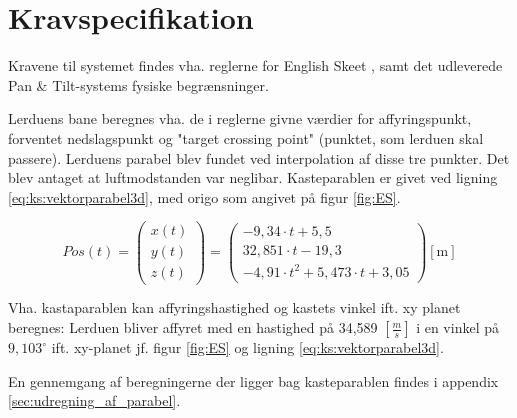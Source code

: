 \section{Kravspecifikation}
\label{sec:kravspecifikation}
Kravene til systemet findes vha. reglerne for English Skeet \citep{ES_regler},
samt det udleverede Pan \& Tilt-systems fysiske begrænsninger.


Lerduens bane beregnes vha. de i reglerne givne værdier for affyringspunkt, forventet nedslagspunkt
og "target crossing point" (punktet, som lerduen skal passere).
Lerduens parabel blev fundet ved interpolation af disse tre punkter. Det blev antaget at luftmodstanden var neglibar.
Kasteparablen er givet ved ligning \ref{eq:ks:vektorparabel3d}, med origo som angivet på figur \ref{fig:ES}.

\begin{equation}
Pos\left( t \right) = 
\left( \begin{matrix} 
	x\left( t \right)  \\ 
	y\left( t \right)  \\ 
	z\left( t \right)  \end{matrix} \right) =
	 \left( \begin{matrix} 
	- 9,34\cdot t+5,5 \\
  32,851\cdot t-19,3 \\ 
 -{ 4,91\cdot t }^{ 2 }+5,473\cdot t+3,05\end{matrix} \right) [\text{m}]
\label{eq:ks:vektorparabel3d}
\end{equation}

Vha. kastaparablen kan affyringshastighed og kastets vinkel ift. xy planet beregnes: 
Lerduen bliver affyret med en hastighed på 34,589 \([\frac{m}{s}]\) i en vinkel på \(9,103^{\circ}\) 
ift. xy-planet jf. figur \ref{fig:ES} og ligning \ref{eq:ks:vektorparabel3d}. 

En gennemgang af beregningerne der ligger bag kasteparablen findes i appendix \ref{sec:udregning_af_parabel}.

